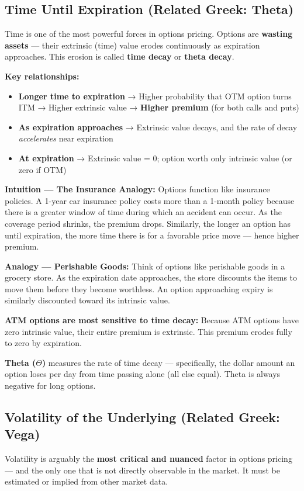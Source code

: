 \documentclass[12pt,openany]{book}
\theoremstyle{definition}
\theoremstyle{remark}
\begin{document}
\medskip
\subsection{Time Until Expiration (Related Greek: Theta)}
Time is one of the most powerful forces in options pricing. Options are \textbf{wasting assets} --- their extrinsic (time) value erodes continuously as expiration approaches. This erosion is called \textbf{time decay} or \textbf{theta decay}.

\textbf{Key relationships:}

\begin{itemize}
\item \textbf{Longer time to expiration} → Higher probability that OTM option turns ITM → Higher extrinsic value → \textbf{Higher premium} (for both calls and puts)


\item \textbf{As expiration approaches} → Extrinsic value decays, and the rate of decay \emph{accelerates} near expiration


\item \textbf{At expiration} → Extrinsic value = 0; option worth only intrinsic value (or zero if OTM)


\end{itemize}
\textbf{Intuition --- The Insurance Analogy:} Options function like insurance policies. A 1-year car insurance policy costs more than a 1-month policy because there is a greater window of time during which an accident can occur. As the coverage period shrinks, the premium drops. Similarly, the longer an option has until expiration, the more time there is for a favorable price move --- hence higher premium.

\textbf{Analogy --- Perishable Goods:} Think of options like perishable goods in a grocery store. As the expiration date approaches, the store discounts the items to move them before they become worthless. An option approaching expiry is similarly discounted toward its intrinsic value.

\textbf{ATM options are most sensitive to time decay:} Because ATM options have zero intrinsic value, their entire premium is extrinsic. This premium erodes fully to zero by expiration.

\textbf{Theta (\(\Theta\))} measures the rate of time decay --- specifically, the dollar amount an option loses per day from time passing alone (all else equal). Theta is always negative for long options.

\medskip
\subsection{Volatility of the Underlying (Related Greek: Vega)}
Volatility is arguably the \textbf{most critical and nuanced} factor in options pricing --- and the only one that is not directly observable in the market. It must be estimated or implied from other market data.
\end{document}
